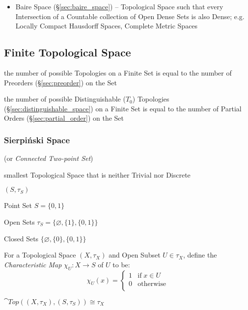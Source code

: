 \begin{itemize}
  \item Baire Space (\S\ref{sec:baire_space}) -- Topological Space such that
    every Intersection of a Countable collection of Open Dense Sets is also
    Dense; e.g. Locally Compact Hausdorff Spaces, Complete Metric Spaces
\end{itemize}



\subsection{Finite Topological Space}\label{sec:finite_topological_space}

the number of possible Topologies on a Finite Set is equal to the number of
Preorders (\S\ref{sec:preorder}) on the Set

the number of possible Distinguishable ($T_0$) Topologies
(\S\ref{sec:distinguishable_space}) on a Finite Set is equal to the number of
Partial Orders (\S\ref{sec:partial_order}) on the Set



\subsubsection{Sierpi\'nski Space}\label{sec:sierpinski_space}

(or \emph{Connected Two-point Set})

smallest Topological Space that is neither Trivial nor Discrete

$(S,\tau_S)$

Point Set $S = \{0,1\}$

Open Sets $\tau_S = \{\varnothing, \{1\}, \{0,1\}\}$

Closed Sets $\{\varnothing, \{0\}, \{0,1\}\}$

For a Topological Space $(X,\tau_X)$ and Open Subset $U \in \tau_X$,
define the \emph{Characteristic Map} $\chi_U : X \rightarrow S$ of $U$ to be:
\[
  \chi_U (x) =
  \begin{cases}
    1  & \text{if}\; x \in U \\
    0  & \text{otherwise} \\
  \end{cases}
\]

$\cat{Top}((X,\tau_X),(S,\tau_S)) \cong \tau_X$

